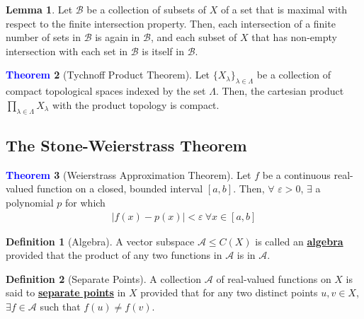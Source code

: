 \documentclass[11pt]{article}
\theoremstyle{definition}
\theoremstyle{definition}
\newcommand{\dfn}[1]{\underline{\textbf{#1}}}
\newtheorem{theorem}{\textcolor{blue}{Theorem}}
\newtheorem{lemma}[theorem]{Lemma}
\theoremstyle{definition}
\newtheorem{definition}{\textcolor{OliveGreen}{Definition}}
\theoremstyle{remark}
\begin{document}
\begin{lemma}
	Let $\mathcal{B}$ be a collection of subsets of $X$ of a set that is maximal with respect to the finite intersection property. Then, each intersection of a finite number of sets in $\mathcal{B}$ is again in $\mathcal{B}$, and each subset of $X$ that has non-empty intersection with each set in $\mathcal{B}$ is itself in $\mathcal{B}$. 
\end{lemma}

\begin{theorem}[Tychnoff Product Theorem]
	Let $\{ X_\lambda \}_{\lambda \in \Lambda}$ be a collection of compact topological spaces indexed by the set $\Lambda$. Then, the cartesian product $\prod_{\lambda \in \Lambda} X_\lambda$ with the product topology is compact. 
\end{theorem}
\subsection{The Stone-Weierstrass Theorem}
\begin{theorem}[Weierstrass Approximation Theorem]
	Let $f$ be a continuous real-valued function on a closed, bounded interval $[a,b]$. Then, $\forall$ $\varepsilon > 0$, $\exists$ a polynomial $p$ for which 
	\begin{align}
		|f(x) - p(x) | < \varepsilon\ \forall x \in [a,b] 	
	\end{align}

\end{theorem}

\begin{definition}[Algebra]
	A vector subspace $\mathcal{A} \leq C(X)$ is called an \dfn{algebra} provided that the product of any two functions in $\mathcal{A}$ is in $\mathcal{A}$. 
\end{definition}


\begin{definition}[Separate Points]
	A collection $\mathcal{A}$ of real-valued functions  on $X$ is said to \dfn{separate points} in $X$ provided that for any two distinct points $u, v \in X$, $\exists f \in \mathcal{A}$ such that $f(u) \neq f(v)$. 
\end{definition}
\end{document}
